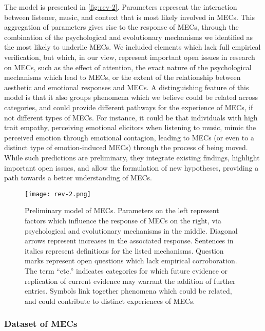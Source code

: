 The model is presented in \autoref{fig:rev-2}. Parameters represent the interaction between listener, music, and context that is most likely involved in MECs. This aggregation of parameters gives rise to the response of MECs, through the combination of the psychological and evolutionary mechanisms we identified as the most likely to underlie MECs. We included elements which lack full empirical verification, but which, in our view, represent important open issues in research on MECs, such as the effect of attention, the exact nature of the psychological mechanisms which lead to MECs, or the extent of the relationship between aesthetic and emotional responses and MECs. A distinguishing feature of this model is that it also groups phenomena which we believe could be related across categories, and could provide different pathways for the experience of MECs, if not different types of MECs. For instance, it could be that individuals with high trait empathy, perceiving emotional elicitors when listening to music, mimic the perceived emotion through emotional contagion, leading to MECs (or even to a distinct type of emotion-induced MECs) through the process of being moved. While such predictions are preliminary, they integrate existing findings, highlight important open issues, and allow the formulation of new hypotheses, providing a path towards a better understanding of MECs.

\begin{figure}[t!]
\texttt{[image: rev-2.png]}
\centering
\caption{Preliminary model of MECs. Parameters on the left represent factors which influence the response of MECs on the right, via psychological and evolutionary mechanisms in the middle. Diagonal arrows represent increases in the associated response. Sentences in italics represent definitions for the listed mechanisms. Question marks represent open questions which lack empirical corroboration. The term ``etc.'' indicates categories for which future evidence or replication of current evidence may warrant the addition of further entries. Symbols link together phenomena which could be related, and could contribute to distinct experiences of MECs.}
\label{fig:rev-2}
\end{figure}

\subsubsection{Dataset of MECs}

